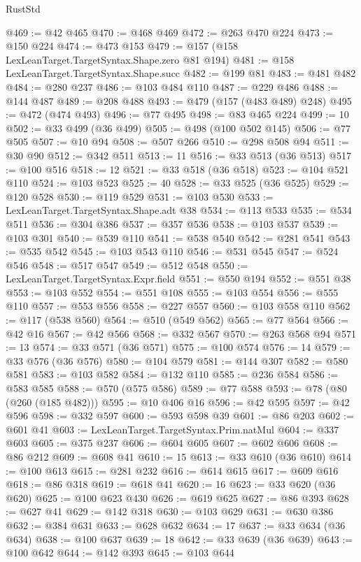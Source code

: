 \begin{lexlean}{RustStd}
\begin{coremodule}
@469 := @42 @465
@470 := @468 @469
@472 := @263 @470 @224
@473 := @150 @224
@474 := @473 @153
@479 := @157 (@158 LexLeanTarget.TargetSyntax.Shape.zero @81 @194)
@481 := @158 LexLeanTarget.TargetSyntax.Shape.succ
@482 := @199 @81
@483 := @481 @482
@484 := @280 @237
@486 := @103 @484 @110
@487 := @229 @486
@488 := @144 @487
@489 := @208 @488
@493 := @479 (@157 (@483 @489) @248)
@495 := @472 (@474 @493)
@496 := @77 @495
@498 := @83 @465 @224
@499 := 10
@502 := @33 @499 (@36 @499)
@505 := @498 (@100 @502 @145)
@506 := @77 @505
@507 := @10 @94
@508 := @507 @266
@510 := @298 @508 @94
@511 := @30 @90
@512 := @342 @511
@513 := 11
@516 := @33 @513 (@36 @513)
@517 := @100 @516
@518 := 12
@521 := @33 @518 (@36 @518)
@523 := @104 @521 @110
@524 := @103 @523
@525 := 40
@528 := @33 @525 (@36 @525)
@529 := @120 @528
@530 := @119 @529
@531 := @103 @530
@533 := LexLeanTarget.TargetSyntax.Shape.adt @38
@534 := @113 @533
@535 := @534 @511
@536 := @304 @386
@537 := @357 @536
@538 := @103 @537
@539 := @103 @301
@540 := @539 @110
@541 := @538 @540
@542 := @281 @541
@543 := @535 @542
@545 := @103 @543 @110
@546 := @531 @545
@547 := @524 @546
@548 := @517 @547
@549 := @512 @548
@550 := LexLeanTarget.TargetSyntax.Expr.field
@551 := @550 @194
@552 := @551 @38
@553 := @103 @552
@554 := @551 @108
@555 := @103 @554
@556 := @555 @110
@557 := @553 @556
@558 := @227 @557
@560 := @103 @558 @110
@562 := @117 (@538 @560)
@564 := @510 (@549 @562)
@565 := @77 @564
@566 := @42 @16
@567 := @42 @566
@568 := @332 @567
@570 := @263 @568 @94
@571 := 13
@574 := @33 @571 (@36 @571)
@575 := @100 @574
@576 := 14
@579 := @33 @576 (@36 @576)
@580 := @104 @579
@581 := @144 @307
@582 := @580 @581
@583 := @103 @582
@584 := @132 @110
@585 := @236 @584
@586 := @583 @585
@588 := @570 (@575 @586)
@589 := @77 @588
@593 := @78 (@80 (@260 (@185 @482)))
@595 := @10 @406 @16
@596 := @42 @595
@597 := @42 @596
@598 := @332 @597
@600 := @593 @598 @39
@601 := @86 @203
@602 := @601 @41
@603 := LexLeanTarget.TargetSyntax.Prim.natMul
@604 := @337 @603
@605 := @375 @237
@606 := @604 @605
@607 := @602 @606
@608 := @86 @212
@609 := @608 @41
@610 := 15
@613 := @33 @610 (@36 @610)
@614 := @100 @613
@615 := @281 @232
@616 := @614 @615
@617 := @609 @616
@618 := @86 @318
@619 := @618 @41
@620 := 16
@623 := @33 @620 (@36 @620)
@625 := @100 @623 @430
@626 := @619 @625
@627 := @86 @393
@628 := @627 @41
@629 := @142 @318
@630 := @103 @629
@631 := @630 @386
@632 := @384 @631
@633 := @628 @632
@634 := 17
@637 := @33 @634 (@36 @634)
@638 := @100 @637
@639 := 18
@642 := @33 @639 (@36 @639)
@643 := @100 @642
@644 := @142 @393
@645 := @103 @644

\end{coremodule}
\end{lexlean}
